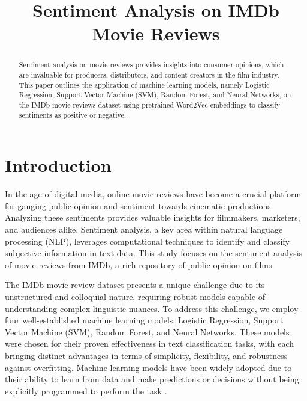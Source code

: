 \documentclass[conference]{IEEEtran}
\begin{document}
	
	\title{Sentiment Analysis on IMDb Movie Reviews}
	\author{
		}
	\maketitle
	
	\begin{abstract}
		Sentiment analysis on movie reviews provides insights into consumer opinions, which are invaluable for producers, distributors, and content creators in the film industry. This paper outlines the application of machine learning models, namely Logistic Regression, Support Vector Machine (SVM), Random Forest, and Neural Networks, on the IMDb movie reviews dataset using pretrained Word2Vec embeddings to classify sentiments as positive or negative.
	\end{abstract}
	
	\IEEEpeerreviewmaketitle

	\section{Introduction}
	In the age of digital media, online movie reviews have become a crucial platform for gauging public opinion and sentiment towards cinematic productions. Analyzing these sentiments provides valuable insights for filmmakers, marketers, and audiences alike. Sentiment analysis, a key area within natural language processing (NLP), leverages computational techniques to identify and classify subjective information in text data. This study focuses on the sentiment analysis of movie reviews from IMDb, a rich repository of public opinion on films.
	
	The IMDb movie review dataset  presents a unique challenge due to its unstructured and colloquial nature, requiring robust models capable of understanding complex linguistic nuances. To address this challenge, we employ four well-established machine learning models: Logistic Regression, Support Vector Machine (SVM), Random Forest, and Neural Networks. These models were chosen for their proven effectiveness in text classification tasks, with each bringing distinct advantages in terms of simplicity, flexibility, and robustness against overfitting. Machine learning models have been widely adopted due to their ability to learn from data and make predictions or decisions without being explicitly programmed to perform the task \citep{MLModelsUtility}.
\end{document}
